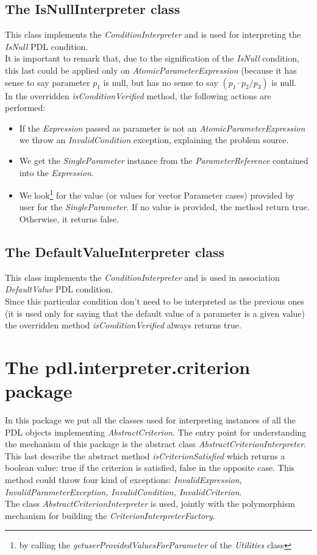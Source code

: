 \documentclass[a4paper,11pt] {ivoa}
\begin{document}
\subsection{The IsNullInterpreter class}
This class  implements the  {\it ConditionInterpreter} and is used for interpreting the {\it IsNull} PDL condition. \\
It is important to remark that, due to the signification of the {\it IsNull} condition, this last could be applied only on {\it AtomicParameterExpression} (because it has sense to say parameter $p_1$ is null, but has no sense to say $(p_1 \cdot p_2 / p_3)$ is null.\\
In the overridden {\it isConditionVerified} method, the following actions are performed:
\begin{itemize}
\item If the {\it Expression} passed as parameter is not an {\it AtomicParameterExpression} we throw an {\it InvalidCondition} exception, explaining the problem source.
\item We get the {\it SingleParameter} instance from the {\it ParameterReference} contained into the {\it Expression}.
\item We look\footnote{by calling the {\it getuserProvidedValuesForParameter} of the {\it Utilities} class} for the value (or values for vector Parameter cases) provided by user for the {\it SingleParameter}. If no value is provided, the method return true. Otherwise, it returns false.
\end{itemize}

\subsection{The DefaultValueInterpreter class}
This class implements the {\it ConditionInterpreter} and is used in association {\it DefaultValue} PDL condition. \\
Since this particular condition don't need to be interpreted as the previous ones (it is used only for saying that the default value of a parameter is a given value) the overridden method  {\it isConditionVerified}  always returns true.

\section{The pdl.interpreter.criterion package}
In this package we put all the classes used for interpreting instances of all the PDL objects implementing {\it AbstractCriterion}.
The entry point for understanding the mechanism of this package is the abstract class {\it AbstractCriterionInterpreter}.
This last describe the abstract method {\it isCriterionSatisfied} which returns a boolean value: true if the criterion is satisfied, false in the opposite case. This method could throw four kind of exceptions: {\it InvalidExpression, InvalidParameterException, InvalidCondition, InvalidCriterion}.\\
The class  {\it AbstractCriterionInterpreter} is used, jointly with the polymorphism mechanism for building the {\it CriterionInterpreterFactory}.
\end{document}
